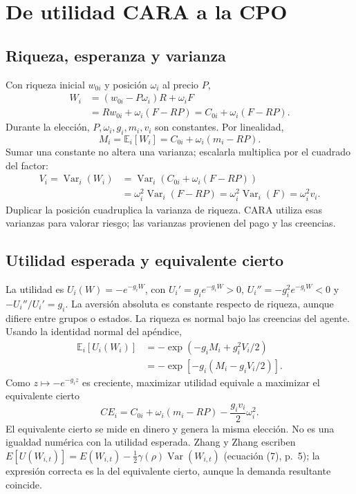 \documentclass[11pt]{article}
\newcommand{\E}{\mathbb E}
\newcommand{\Var}{\operatorname{Var}}
\begin{document}
\section{De utilidad CARA a la CPO}
\subsection{Riqueza, esperanza y varianza}
Con riqueza inicial $w_{0i}$ y posición $\omega_i$ al precio $P$,
\begin{align}
 W_i&=(w_{0i}-P\omega_i)R+\omega_i F\\
 &=Rw_{0i}+\omega_i(F-RP)=C_{0i}+\omega_i(F-RP).
\end{align}
Durante la elección, $P,\omega_i,g_i,m_i,v_i$ son constantes. Por linealidad,
\begin{equation}
 M_i=\E_i[W_i]=C_{0i}+\omega_i(m_i-RP).
\end{equation}
Sumar una constante no altera una varianza; escalarla multiplica por el
cuadrado del factor:
\begin{align}
 V_i=\Var_i(W_i)
 &=\Var_i(C_{0i}+\omega_i(F-RP))\\
 &=\omega_i^2\Var_i(F-RP)=\omega_i^2\Var_i(F)=\omega_i^2v_i.
\end{align}
Duplicar la posición cuadruplica la varianza de riqueza. CARA utiliza esas
varianzas para valorar riesgo; las varianzas provienen del pago y las creencias.

\subsection{Utilidad esperada y equivalente cierto}
La utilidad es $U_i(W)=-e^{-g_iW}$, con
$U_i'=g_i e^{-g_iW}>0$, $U_i''=-g_i^2e^{-g_iW}<0$ y
$-U_i''/U_i'=g_i$. La aversión absoluta es constante respecto de riqueza,
aunque difiere entre grupos o estados. La riqueza es normal bajo las
creencias del agente. Usando la identidad normal del apéndice,
\begin{align}
 \E_i[U_i(W_i)]
 &=-\exp(-g_iM_i+g_i^2V_i/2)\\
 &=-\exp[-g_i(M_i-g_iV_i/2)].
\end{align}
Como $z\mapsto-e^{-g_i z}$ es creciente, maximizar utilidad equivale a
maximizar el equivalente cierto
\begin{equation}\label{eq:ce}
 CE_i=C_{0i}+\omega_i(m_i-RP)-\frac{g_iv_i}{2}\omega_i^2.
\end{equation}
El equivalente cierto se mide en dinero y genera la misma elección.
No es una igualdad numérica con la utilidad esperada. Zhang y Zhang
escriben $E[U(W_{i,t})]=E(W_{i,t})-\tfrac12\gamma(\rho)\Var(W_{i,t})$
(ecuación (7), p.~5); la expresión correcta es la del equivalente cierto,
aunque la demanda resultante coincide.
\end{document}
